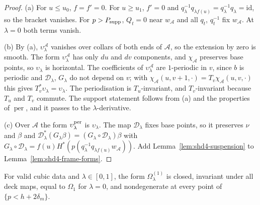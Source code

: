 \begin{proof}
(a) For $u\le u_0$, $f=f'=0$. For $u\ge u_1$, $f'=0$ and $q_\lambda^{-1}q_{\lambda f(u)}=q_\lambda^{-1}q_\lambda=\mathrm{id}$, so the bracket vanishes.
For $p>P_{\rm supp}$, $Q_t=0$ near $w_{\mathcal A}$ and all $q_t$, $q_t^{-1}$ fix $w_{\mathcal A}$. At $\lambda=0$ both terms vanish.

(b) By (a), $\upsilon^{\mathcal A}_\lambda$ vanishes over collars of both ends of $\mathcal A$, so the extension by zero is smooth. The form
$\upsilon^{\mathcal A}_\lambda$ has only $du$ and $dv$ components, and $\chi_{\mathcal A}$ preserves base points, so $\upsilon_\lambda$ is horizontal.
The coefficients of $\upsilon^{\mathcal A}_\lambda$ are $1$-periodic in $v$, since $b$ is periodic and $\mathcal D_\lambda$, $G_\lambda$ do not
depend on $v$; with $\chi_{\mathcal A}(u,v+1,\cdot)=T_v\chi_{\mathcal A}(u,v,\cdot)$ this gives $T_v^*\upsilon_\lambda=\upsilon_\lambda$. The
periodisation is $T_u$-invariant, and $T_v$-invariant because $T_u$ and $T_v$ commute. The support statement follows from (a)
and the properties of $\operatorname{per}$, and it passes to the $\lambda$-derivative.

(c) Over $\mathcal A$ the form $\upsilon^{\rm per}_\lambda$ is $\upsilon_\lambda$. The map $\mathcal D_\lambda$ fixes base points, so it preserves $\nu$ and
$\beta$ and $\mathcal D_\lambda^*(G_\lambda\beta)=(G_\lambda\circ\mathcal D_\lambda)\beta$ with
$G_\lambda\circ\mathcal D_\lambda=f(u)H^*(p(q_\lambda^{-1}q_{\lambda f(u)}w_{\mathcal A}))$. Add
Lemma~\ref{lem:shd4-suspension} to Lemma~\ref{lem:shd4-frame-forms}.
\end{proof}

\begin{proposition}\label{prop:shd4-second}
For valid cubic data and $\lambda\in[0,1]$, the form $\Omega^{(1)}_\lambda$ is closed, invariant under all deck maps, equal to
$\Omega_1$ for $\lambda=0$, and nondegenerate at every point of $\{p<h+2\delta_m\}$.
\end{proposition}

